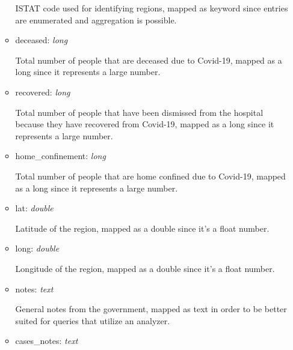 \documentclass[12pt, a4paper]{article}
\begin{document}
\begin{itemize}
\begin{itemize}
\begin{footnotesize}
          ISTAT code used for identifying regions, mapped as keyword since entries are 
          enumerated and aggregation is possible.
        \end{footnotesize}
      \item deceased: \emph{long} \\
        \begin{footnotesize}
          Total number of people that are deceased due to Covid-19, mapped as a long 
          since it represents a large number.
        \end{footnotesize}
      \item recovered: \emph{long} \\
        \begin{footnotesize}
          Total number of people that have been dismissed from the hospital because they
          have recovered from Covid-19, mapped as a long since it represents a large 
          number.
        \end{footnotesize}
      \item home\_confinement: \emph{long} \\
        \begin{footnotesize}
          Total number of people that are home confined due to Covid-19, mapped as a long
          since it represents a large number.
        \end{footnotesize}
      \item lat: \emph{double} \\
        \begin{footnotesize}
          Latitude of the region, mapped as a double since it's a float number.
        \end{footnotesize}
      \item long: \emph{double} \\
        \begin{footnotesize}
          Longitude of the region, mapped as a double since it's a float number.
        \end{footnotesize}
      \item notes: \emph{text} \\
        \begin{footnotesize}
          General notes from the government, mapped as text in order to be better 
          suited for queries that utilize an analyzer.
        \end{footnotesize}
      \item cases\_notes: \emph{text} \\

\end{itemize}
\end{itemize}
\end{document}
